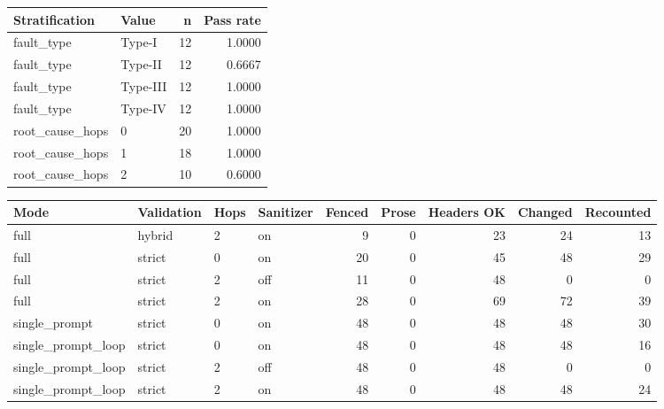 \begin{table}[ht]
\centering
\begin{tabular}{llrr}
Stratification & Value & n & Pass rate \\
\hline
fault_type & Type-I & 12 & 1.0000 \\
fault_type & Type-II & 12 & 0.6667 \\
fault_type & Type-III & 12 & 1.0000 \\
fault_type & Type-IV & 12 & 1.0000 \\
root_cause_hops & 0 & 20 & 1.0000 \\
root_cause_hops & 1 & 18 & 1.0000 \\
root_cause_hops & 2 & 10 & 0.6000 \\
\end{tabular}
\end{table}
\begin{table}[ht]
\centering
\begin{tabular}{llllrrrrr}
Mode & Validation & Hops & Sanitizer & Fenced & Prose & Headers OK & Changed & Recounted \\
\hline
full & hybrid & 2 & on & 9 & 0 & 23 & 24 & 13 \\
full & strict & 0 & on & 20 & 0 & 45 & 48 & 29 \\
full & strict & 2 & off & 11 & 0 & 48 & 0 & 0 \\
full & strict & 2 & on & 28 & 0 & 69 & 72 & 39 \\
single\_prompt & strict & 0 & on & 48 & 0 & 48 & 48 & 30 \\
single\_prompt\_loop & strict & 0 & on & 48 & 0 & 48 & 48 & 16 \\
single\_prompt\_loop & strict & 2 & off & 48 & 0 & 48 & 0 & 0 \\
single\_prompt\_loop & strict & 2 & on & 48 & 0 & 48 & 48 & 24 \\
\end{tabular}
\end{table}
